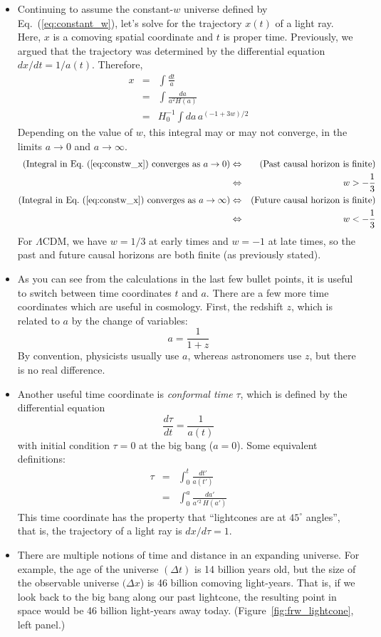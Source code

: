 \documentclass[aps,prd,superscriptaddress,groupedaddress,nofootinbib,nobibnotes]{revtex4}
\newcommand{\be}{\begin{equation}}
\newcommand{\ee}{\end{equation}}
\newcommand{\ba}{\begin{eqnarray}}
\newcommand{\ea}{\end{eqnarray}}
\newcommand{\nn}{\nonumber}
\begin{document}
\begin{itemize}
\item
Continuing to assume the constant-$w$ universe defined by Eq.~(\ref{eq:constant_w}), let's
solve for the trajectory $x(t)$ of a light ray.  Here, $x$ is a comoving spatial coordinate
and $t$ is proper time.  Previously, we argued that the trajectory was determined by the
differential equation $dx/dt = 1/a(t)$.  Therefore,
\ba
x &=& \int \frac{dt}{a} \nn \\
  &=& \int \frac{da}{a^2 H(a)} \nn \\
  &=& H_0^{-1} \int da \, a^{(-1+3w)/2}  \label{eq:constw_x}
\ea
Depending on the value of $w$, this integral may or may not converge, in the limits $a\rightarrow 0$ and $a \rightarrow \infty$.
\ba
\mbox{(Integral in Eq.~(\ref{eq:constw_x}) converges as $a\rightarrow 0$)}
 & \Leftrightarrow &
\mbox{(Past causal horizon is finite)} \nn \\
 & \Leftrightarrow &
w > -\frac{1}{3} \\
\mbox{(Integral in Eq.~(\ref{eq:constw_x}) converges as $a\rightarrow \infty$)}
 & \Leftrightarrow &
\mbox{(Future causal horizon is finite)} \nn \\
 & \Leftrightarrow &
w < -\frac{1}{3}
\ea
For $\Lambda$CDM, we have $w=1/3$ at early times and $w=-1$ at late times,
so the past and future causal horizons are both finite (as previously stated).

\item
As you can see from the calculations in the last few bullet points, 
it is useful to switch between time coordinates $t$ and $a$.
There are a few more time coordinates which are useful in cosmology.
First, the redshift $z$, which is related to $a$ by the change of variables:
\be
a = \frac{1}{1+z}
\ee
By convention, physicists usually use $a$, whereas astronomers use $z$,
but there is no real difference.

\item
Another useful time coordinate is {\em conformal time} $\tau$, which is defined by
the differential equation
\be
\frac{d\tau}{dt} = \frac{1}{a(t)}
\ee
with initial condition $\tau=0$ at the big bang ($a=0$).  Some equivalent definitions:
\ba
\tau
  &=& \int_0^t \frac{dt'}{a(t')} \nn \\
  &=& \int_0^a \frac{da'}{a'{}^2 \, H(a')}
\ea
This time coordinate has the property that ``lightcones are at $45^\circ$ angles'',
that is, the trajectory of a light ray is $dx/d\tau=1$.

\item
 There are multiple notions of time and distance in an expanding universe.
 For example, the age of the universe $(\Delta t)$ is 14 billion years old, 
 but the size of the observable universe $(\Delta x$) is 46 billion comoving light-years.
 That is, if we look back to the big bang along our past lightcone, the resulting point in space
 would be 46 billion light-years away today.  (Figure~\ref{fig:frw_lightcone}, left panel.)


\end{itemize}
\end{document}
